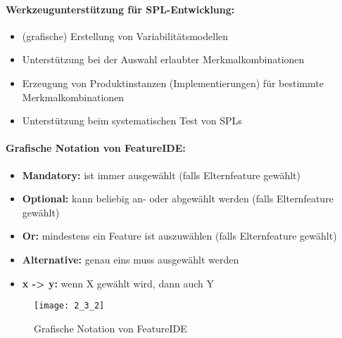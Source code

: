 \paragraph{Werkzeugunterstützung für SPL-Entwicklung:}
\begin{itemize}
	\item (grafische) Erstellung von Variabilitätsmodellen
	\item Unterstützung bei der Auswahl erlaubter Merkmalkombinationen
	\item Erzeugung von Produktinstanzen (Implementierungen) für bestimmte Merkmalkombinationen
	\item Unterstützung beim systematischen Test von SPLs
\end{itemize}
\paragraph{Grafische Notation von FeatureIDE:}
\begin{itemize}
	\item \textbf{Mandatory:} ist immer ausgewählt (falls Elternfeature gewählt)
	\item \textbf{Optional:} kann beliebig an- oder abgewählt werden (falls Elternfeature gewählt)
	\item \textbf{Or:} mindestens ein Feature ist auszuwählen (falls Elternfeature gewählt)
	\item \textbf{Alternative:} genau eins muss ausgewählt werden
	\item \textbf{x -> y:} wenn X gewählt wird, dann auch Y
\end{itemize}
\begin{figure}[h]
	\centering
	\caption{Grafische Notation von FeatureIDE}
	\texttt{[image: 2\_3\_2]}
\end{figure}
